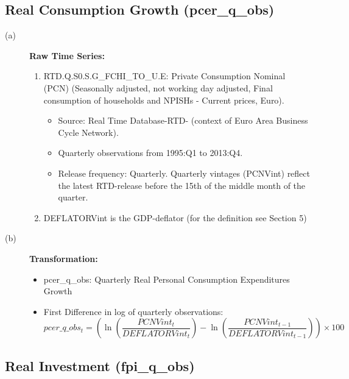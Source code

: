 \documentclass[3p,review,times]{elsarticle}		%
\begin{document}
\subsection{Real Consumption Growth (pcer\_q\_obs)}
\begin{description}
	\item[(a)] \textbf{Raw Time Series:} 
	\begin{enumerate}
		\item RTD.Q.S0.S.G\_FCHI\_TO\_U.E: Private Consumption Nominal (PCN) (Seasonally adjusted, not working day adjusted, Final consumption of households and NPISHs - Current prices, Euro).
		\begin{itemize}
			\item Source: Real Time Database-RTD- (context of Euro Area Business Cycle Network). 
			\item Quarterly observations from 1995:Q1 to 2013:Q4. 
			\item Release frequency: Quarterly. Quarterly vintages (PCNVint) reflect the latest RTD-release before the 15th of the middle month of the quarter.
		\end{itemize}
		\item DEFLATORVint is the GDP-deflator (for the definition see Section 5)
	\end{enumerate}
	\item[(b)] \textbf{Transformation:}
	\begin{itemize}
		\item pcer\_q\_obs: Quarterly  Real Personal Consumption Expenditures Growth
		\item First Difference in log of quarterly observations:
		$$pcer\_q\_obs_{t}=\left(\ln\left(\frac{PCNVint_t}{DEFLATORVint_t}\right)-\ln\left(\frac{PCNVint_{t-1}}{DEFLATORVint_{t-1}}\right)\right)\times 100$$
	\end{itemize}
\end{description}
\subsection{Real Investment (fpi\_q\_obs)}
\end{document}
